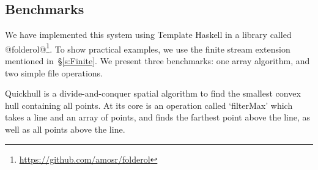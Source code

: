 % 
% 
% 
% 


\subsection{Benchmarks}
We have implemented this system using Template Haskell in a library called @folderol@\footnote{\url{https://github.com/amosr/folderol}}.
To show practical examples, we use the finite stream extension mentioned in~\S\ref{s:Finite}.
We present three benchmarks: one array algorithm, and two simple file operations.


Quickhull is a divide-and-conquer spatial algorithm to find the smallest convex hull containing all points.
At its core is an operation called `filterMax' which takes a line and an array of points, and finds the farthest point above the line, as well as all points above the line.

